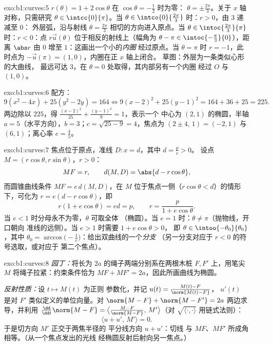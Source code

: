 \begin{solution}{exo:b1:curves:5}
$r(\theta) = 1 + 2\cos\theta$ 在 $\cos\theta = -\frac12$ 时为零：
$\theta = \pm\frac{2\pi}{3}$。关于 $x$ 轴对称，只需研究
$\theta \in \intcc{0}{\pi}$。当 $\theta \in
\intco{0}{\frac{2\pi}{3}}$ 时：$r > 0$，由 $3$ 递减至 $0$：
外层弧，沿与射线 $\theta =
\frac{2\pi}{3}$ 相切的方向进入原点。当 $\theta \in \intoc{\frac{2\pi}{3}}{\pi}$ 时：$r <
0$：点 $r\vec u(\theta)$ 位于相反的射线上（幅角为
$\theta - \pi \in \intoc{-\frac\pi3}{0}$），距离 $\abs r$
由 $0$ 增至 $1$：这画出一个小的\emph{内圈}
经过原点。当 $\theta = \pi$ 时 $r = -1$，此时点为
$-\vec u(\pi) = (1, 0)$，内圈在正 $x$ 轴上闭合。
草图：外层为一条类似心形的大曲线，
最远可达 $3$，在 $\theta = 0$ 处取得，其内部另有一个内圈
经过 $O$ 与 $(1,0)$。
\end{solution}

\begin{solution}{exo:b1:curves:6}
配方：
\[
9(x^2 - 4x) + 25(y^2 - 2y) = 164
\iff 9(x-2)^2 + 25(y-1)^2 = 164 + 36 + 25 = 225 .
\]
两边除以 $225$，得 $\frac{(x-2)^2}{25} + \frac{(y-1)^2}{9} = 1$，表示一个
中心为 $(2, 1)$ 的椭圆，半轴 $a = 5$（水平方向），$b =
3$；$c = \sqrt{25 - 9} = 4$，焦点为 $(2 \pm 4,\, 1) = (-2, 1)$ 与
$(6, 1)$；离心率 $e = \frac45$。
\end{solution}

\begin{solution}{exo:b1:curves:7}
焦点位于原点，准线 $D: x = d$，其中 $d = \frac pe > 0$。
设点 $M = (r\cos\theta, r\sin\theta)$，$r > 0$：
\[
MF = r,
\qquad
d(M, D) = \abs{d - r\cos\theta},
\]
而圆锥曲线条件 $MF = e\,d(M, D)$，在 $M$
位于焦点一侧（$r\cos\theta < d$）的情形下，可化为 $r
= e(d - r\cos\theta)$，即
\[
r(1 + e\cos\theta) = ed = p,
\qquad
r = \frac{p}{1 + e\cos\theta} .
\]
当 $e < 1$ 时分母永不为零，$\theta$ 可取全体
（椭圆）。当 $e = 1$ 时：$\theta \neq \pi$（抛物线，开口朝向
准线的远侧）。当 $e > 1$ 时需要 $1 + e\cos\theta > 0$，
即 $\theta \in \intoo{-\theta_0}{\theta_0}$，其中 $\theta_0 =
\arccos\bigl(-\frac1e\bigr)$：给出双曲线的一个\emph{分支}
（另一分支对应于 $r < 0$ 的符号选取，或对应于
第二个焦点）。
\end{solution}

\begin{solution}{exo:b1:curves:8}
\emph{园丁：}将长为 $2a$ 的绳子两端分别系在两根木桩 $F,
F'$ 上，用笔尖 $M$ 将绳子拉紧：约束条件恰为
$MF + MF' = 2a$，因此所画曲线为椭圆。

\emph{反射性质：}设 $t \mapsto M(t)$ 为正则
参数化，并记 $u(t) = \frac{M(t) - F}{\norm{M(t) - F}}$，
$u'(t)$ 是对 $F'$ 类似定义的单位向量。对
$\norm{M - F} + \norm{M - F'} = 2a$ 两边求导，并利用 $\frac{\dd}{\dd
t}\norm{M - F} = \bigl\langle \frac{M - F}{\norm{M-F}},\,
M'\bigr\rangle$（对 $\sqrt{\langle\cdot,\cdot\rangle}$ 用链式法则）：
\[
\bigl\langle u + u',\, M'\bigr\rangle = 0 .
\]
于是切方向 $M'$ 正交于两焦半径的
平分线方向 $u + u'$：切线
与 $MF$、$MF'$ 所成角相等。（从一个焦点发出的光线
经椭圆反射后射向另一焦点。）
\end{solution}

